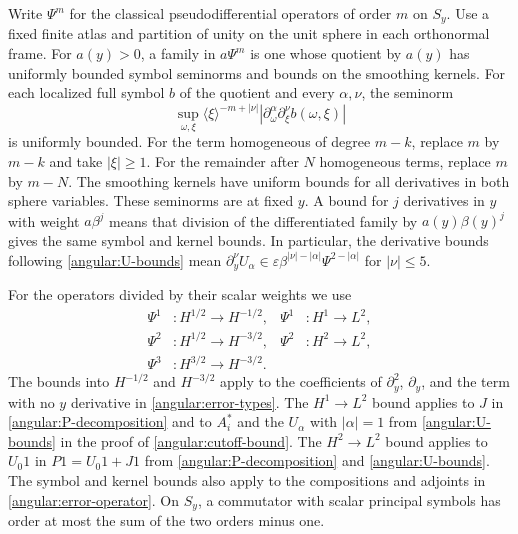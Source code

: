 \documentclass[11pt,a4paper]{article}
\theoremstyle{definition}
\theoremstyle{remark}
\newcommand{\eps}{\varepsilon}
\numberwithin{equation}{section}
\begin{document}
Write $\Psi^m$ for the classical pseudodifferential operators of order
$m$ on $S_y$. Use a fixed finite atlas and partition of unity on the
unit sphere in each orthonormal frame. For $a(y)>0$, a family in
$a\Psi^m$ is one whose quotient by $a(y)$ has uniformly bounded
symbol seminorms and bounds on the smoothing kernels. For each
localized full symbol $b$ of the quotient and every $\alpha,\nu$,
the seminorm
\[
 \sup_{\omega,\xi}\langle\xi\rangle^{-m+|\nu|}
       |\partial_\omega^\alpha\partial_\xi^\nu b(\omega,\xi)|
\]
is uniformly bounded.
For the term homogeneous of degree $m-k$, replace $m$ by $m-k$ and
take $|\xi|\ge1$. For the remainder after $N$ homogeneous terms,
replace $m$ by $m-N$. The smoothing kernels have uniform bounds
for all derivatives in both sphere variables. These seminorms are
at fixed $y$. A bound for $j$ derivatives in $y$ with weight
$a\beta^j$ means that division of the differentiated family by
$a(y)\beta(y)^j$ gives the same symbol and kernel bounds.
In particular, the derivative bounds following \eqref{angular:U-bounds}
mean $\partial_y^\nu U_\alpha\in
\eps\beta^{|\nu|-|\alpha|}\Psi^{2-|\alpha|}$ for $|\nu|\le5$.

For the operators divided by their scalar weights we use
\begin{align*}
 \Psi^1&:H^{1/2}\longrightarrow H^{-1/2},
       &\Psi^1&:H^1\longrightarrow L^2,\\
 \Psi^2&:H^{1/2}\longrightarrow H^{-3/2},
       &\Psi^2&:H^2\longrightarrow L^2,\\
 \Psi^3&:H^{3/2}\longrightarrow H^{-3/2}.
\end{align*}
The bounds into $H^{-1/2}$ and $H^{-3/2}$ apply to the coefficients
of $\partial_y^2$, $\partial_y$, and the term with no $y$ derivative
in \eqref{angular:error-types}. The $H^1\to L^2$ bound applies to $J$
in \eqref{angular:P-decomposition} and to $A_i^*$ and the $U_\alpha$
with $|\alpha|=1$ from \eqref{angular:U-bounds} in the proof of
\eqref{angular:cutoff-bound}. The
$H^2\to L^2$ bound applies to $U_0 1$ in
$P1=U_0 1+J1$ from \eqref{angular:P-decomposition} and
\eqref{angular:U-bounds}. The symbol and kernel bounds also apply
to the compositions and adjoints in \eqref{angular:error-operator}.
On $S_y$, a commutator with scalar principal symbols has order at
most the sum of the two orders minus one.
\end{document}
